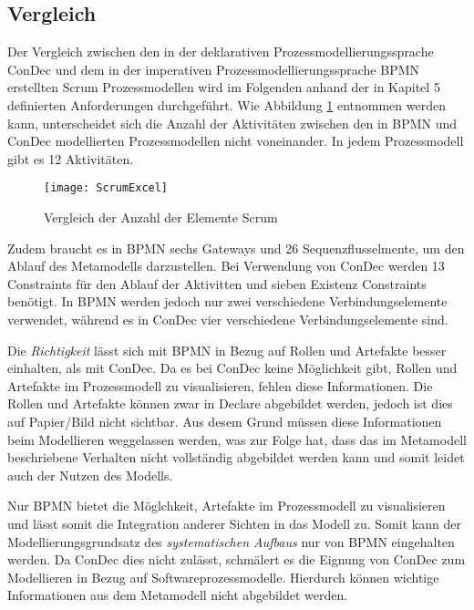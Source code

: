 \subsection{Vergleich}

Der Vergleich zwischen den in der deklarativen Prozessmodellierungssprache ConDec und dem in der imperativen Prozessmodellierungssprache BPMN erstellten Scrum Prozessmodellen wird im Folgenden anhand der in Kapitel 5 definierten Anforderungen durchgeführt. \newline
Wie Abbildung \ref{fig:ScrumExcel} entnommen werden kann, unterscheidet sich die Anzahl der Aktivitäten zwischen den in BPMN und ConDec modellierten Prozessmodellen nicht voneinander. In jedem Prozessmodell gibt es 12 Aktivitäten.\newline

\begin{figure}[htp]
\begin{center}
  \texttt{[image: ScrumExcel]} %
  \caption{Vergleich der Anzahl der Elemente Scrum}
  \label{fig:ScrumExcel}
\end{center}
\end{figure}


Zudem braucht es in BPMN sechs Gateways und 26 Sequenzflusselmente, um den Ablauf des Metamodells darzustellen. Bei Verwendung von ConDec werden 13 Constraints für den Ablauf der Aktivitten und sieben Existenz Constraints benötigt. In BPMN werden jedoch nur zwei verschiedene Verbindungselemente verwendet, während es in ConDec vier verschiedene Verbindungselemente sind.\newline

Die \textit{Richtigkeit} lässt sich mit BPMN in Bezug auf Rollen und Artefakte besser einhalten, als mit ConDec. Da es bei ConDec keine Möglichkeit gibt, Rollen und Artefakte im Prozessmodell zu visualisieren, fehlen diese Informationen. Die Rollen und Artefakte können zwar in Declare abgebildet werden, jedoch ist dies auf Papier/Bild nicht sichtbar. Aus desem Grund müssen diese Informationen beim Modellieren weggelassen werden, was zur Folge hat, dass das im Metamodell beschriebene Verhalten nicht vollständig abgebildet werden kann und somit leidet auch der Nutzen des Modells.\newline

Nur BPMN bietet die Möglchkeit, Artefakte im Prozessmodell zu visualisieren und lässt somit die Integration anderer Sichten in das Modell zu. Somit kann der Modellierungsgrundsatz des \textit{systematischen Aufbaus} nur von BPMN eingehalten werden. Da ConDec dies nicht zulässt, schmälert es die Eignung von ConDec zum Modellieren in Bezug auf Softwareprozessmodelle. Hierdurch können wichtige Informationen aus dem Metamodell nicht abgebildet werden. \newline 

